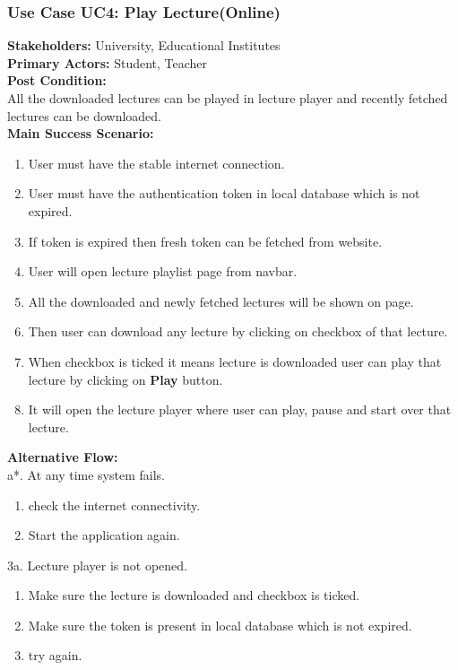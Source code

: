 \documentclass[12pt]{article}
\begin{document}
\subsubsection{Use Case UC4: Play Lecture(Online)}
\textbf{Stakeholders: } University, Educational Institutes \\
\textbf{Primary Actors: } Student, Teacher \\
\textbf{Post Condition: }\\
All the downloaded lectures can be played in lecture player and recently fetched lectures can be downloaded.\\
\newpage
\textbf{Main Success Scenario: }
\begin{enumerate}
\item User must have the stable internet connection.
\item User must have the authentication token in local database which is not expired.
\item If token is expired then fresh token can be fetched from website.
\item User will open lecture playlist page from navbar.
\item All the downloaded and newly fetched lectures will be shown on page.
\item Then user can download any lecture by clicking on checkbox of that lecture.
\item When checkbox is ticked it means lecture is downloaded user can play that lecture by clicking on \textbf{Play} button.
\item It will open the lecture player where user can play, pause and start over that lecture.

\end{enumerate}
\textbf{Alternative Flow: }\\
a*. At any time system fails.
\begin{enumerate}
\item check the internet connectivity.
\item Start the application again.
\end{enumerate}
3a. Lecture player is not opened.
\begin{enumerate}
\item Make sure the lecture is downloaded and checkbox is ticked.
\item Make sure the token is present in local database which is not expired.
\item try again.
\end{enumerate}
\end{document}
